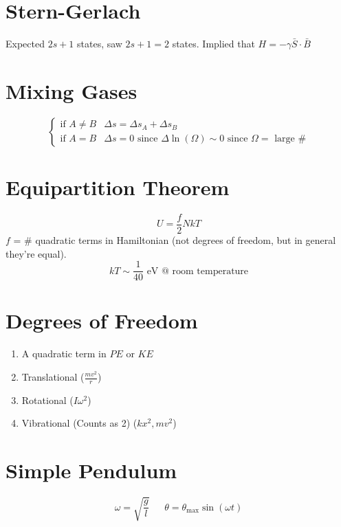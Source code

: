 \documentclass[10pt,letter]{article}
\begin{document}
\section{Stern-Gerlach} %
\label{sec:stern_gerlach}
Expected $2s+1$ states, saw $2s+1=2$ states. Implied that $H = -\gamma \bar{S} \cdot \bar{B}$

\section{Mixing Gases} %
\label{sec:mixing_gases}
\[
  \begin{cases}
   \textrm{if } A \neq B & \Delta s = \Delta s_A + \Delta s_B\\
   \textrm{if } A = B&  \Delta s = 0 \textrm{ since }\Delta\ln(\Omega) \sim 0 \textrm{ since } \Omega = \textrm{ large \#}
  \end{cases}
\]

\section{Equipartition Theorem} %
\label{sec:equipartition_theorem}
\begin{equation}
    U = \frac{f}{2}NkT
\end{equation}
$f$ = \# quadratic terms in Hamiltonian (not degrees of freedom, but in general they're equal).
\begin{equation}
    kT \sim \frac{1}{40} \textrm{ eV @ room temperature}
\end{equation}

\section{Degrees of Freedom} %
\label{sec:degrees_of_freedom}
\begin{enumerate}
    \item A quadratic term in $PE$ or $KE$
    \item Translational ($\frac{mv^2}{r}$)
    \item Rotational ($I\omega^2$)
    \item Vibrational (Counts as 2) ($kx^2, mv^2$)
\end{enumerate}

\section{Simple Pendulum} %
\label{sec:simple_pendulum}
\begin{equation}
    \omega = \sqrt{\frac{g}{l}}~~~~~~~\theta = \theta_{\textrm{max}}\sin(\omega t)
\end{equation}
\end{document}
